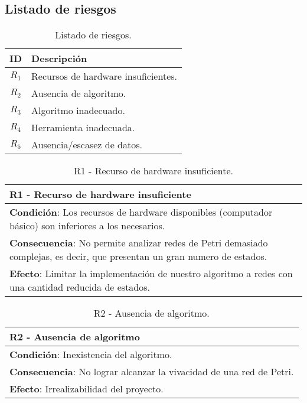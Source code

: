 \subsection{Listado de riesgos}
\begin{table}[H]
    \centering
    \begin{tabular}{|c|p{12.8cm}|}
    \hline
    \textbf{ID} & \textbf{Descripción}  \\  \hline
    $R_{1}$ & Recursos de hardware insuficientes.\\
    \hline
    
    $R_{2}$ & Ausencia de algoritmo. \\ 
    \hline
    
    $R_{3}$ & Algoritmo inadecuado. \\
    \hline
    
    $R_{4}$ & Herramienta inadecuada. \\ 
    \hline
    
    $R_{5}$ & Ausencia/escasez de datos. \\ 
    \hline
    
    \end{tabular}
    \label{tab:listadoRiesgos}
    \caption{Listado de riesgos.}
\end{table}

\begin{table}[H]
    \centering
    \begin{tabular}{|p{13.7cm}|}
    \hline
    \textbf{R1 - Recurso de hardware insuficiente} \\
    \hline \hline 
    \textbf{Condición}: Los recursos de hardware disponibles (computador básico) son inferiores a los necesarios.\\
    \hline
    \textbf{Consecuencia}: No permite analizar redes de Petri demasiado complejas, es decir, que presentan un gran numero de estados. \\
    \hline
    \textbf{Efecto}: Limitar la implementación de nuestro algoritmo a redes con una cantidad reducida de estados. \\
    \hline
    \end{tabular}
    \label{tab:R1}
    \caption{R1 - Recurso de hardware insuficiente.}
\end{table}

\begin{table}[H]
    \centering
    \begin{tabular}{|p{13.7cm}|}
    \hline
    \textbf{R2 - Ausencia de algoritmo} \\
    \hline \hline
    \textbf{Condición}: Inexistencia del algoritmo.\\
    \hline
    \textbf{Consecuencia}: No lograr alcanzar la vivacidad de una red de Petri. \\
    \hline
    \textbf{Efecto}: Irrealizabilidad del proyecto. \\
    \hline
    \end{tabular}
    \label{tab:R2}
    \caption{R2 - Ausencia de algoritmo.}
\end{table}

